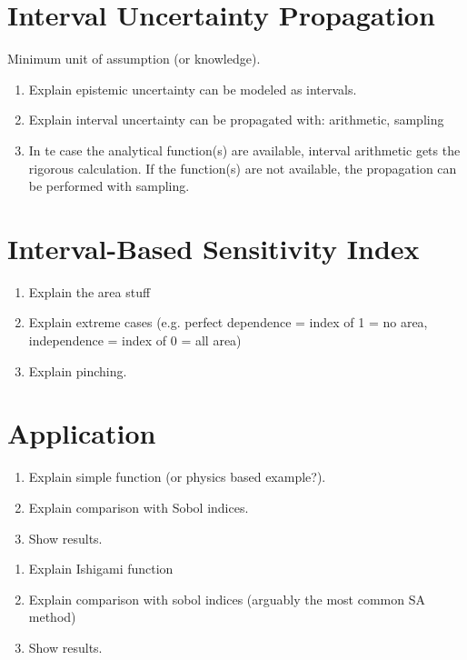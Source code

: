 \documentclass[twocolumn]{rps-esrel2022}
\begin{document}
\section{Interval Uncertainty Propagation}

Minimum unit of assumption (or knowledge).

\begin{enumerate}
	\item Explain epistemic uncertainty can be modeled as intervals.
	\item Explain interval uncertainty can be propagated with: arithmetic, sampling
	\item In te case the analytical function(s) are available, interval arithmetic gets the rigorous calculation.
	If the function(s) are not available, the propagation can be performed with sampling.
\end{enumerate}

\section{Interval-Based Sensitivity Index}

\begin{enumerate}
	\item Explain the area stuff
	\item Explain extreme cases (e.g. perfect dependence = index of 1 = no area, independence = index of 0 = all area)
	\item Explain pinching.
\end{enumerate}

\section{Application}

\begin{enumerate}
	\item Explain simple function (or physics based example?).
	\item Explain comparison with Sobol indices.
	\item Show results.
\end{enumerate}

\begin{enumerate}
	\item Explain Ishigami function
	\item Explain comparison with sobol indices (arguably the most common SA method)
	\item Show results.
\end{enumerate}
\end{document}

